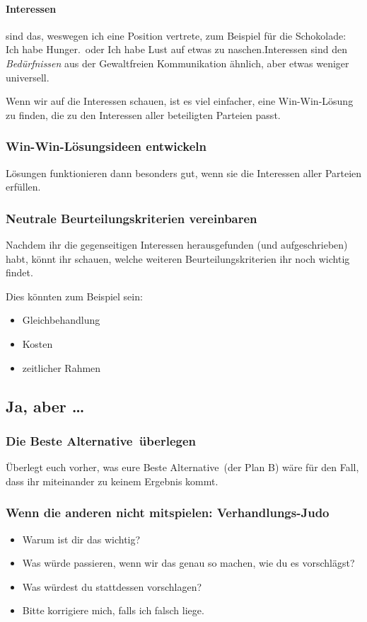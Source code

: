 \paragraph{Interessen} sind das, weswegen ich eine Position vertrete, zum Beispiel für die Schokolade: \glqq Ich habe Hunger.\grqq\ oder \glqq Ich habe Lust auf etwas zu naschen.\grqq Interessen sind den \emph{Bedürfnissen} aus der Gewaltfreien Kommunikation ähnlich, aber etwas weniger universell.

Wenn wir auf die Interessen schauen, ist es viel einfacher, eine Win-Win-Lösung zu finden, die zu den Interessen aller beteiligten Parteien passt.


\subsubsection{Win-Win-Lösungsideen entwickeln}

Lösungen funktionieren dann besonders gut, wenn sie die Interessen aller Parteien erfüllen.


\subsubsection{Neutrale Beurteilungskriterien vereinbaren}

Nachdem ihr die gegenseitigen Interessen herausgefunden (und aufgeschrieben) habt, könnt ihr schauen, welche weiteren Beurteilungskriterien ihr noch wichtig findet.

Dies könnten zum Beispiel sein:

\begin{itemize}
  \item Gleichbehandlung
  \item Kosten
  \item zeitlicher Rahmen
\end{itemize}


\subsection{Ja, aber \ldots}


\subsubsection{Die \glqq Beste Alternative\grqq\ überlegen}

Überlegt euch vorher, was eure \glqq Beste Alternative\grqq\ (der \glqq Plan B\grqq) wäre für den Fall, dass ihr miteinander zu keinem Ergebnis kommt.


\subsubsection{Wenn die anderen nicht mitspielen: Verhandlungs-Judo}

\begin{itemize}
  \item Warum ist dir das wichtig?
  \item Was würde passieren, wenn wir das genau so machen, wie du es vorschlägst?
  \item Was würdest du stattdessen vorschlagen?
  \item Bitte korrigiere mich, falls ich falsch liege.
\end{itemize}
